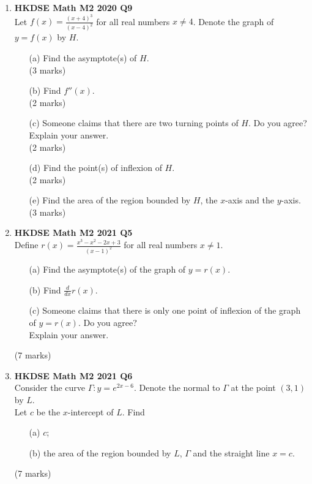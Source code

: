 \documentclass{report}
\begin{document}
\begin{enumerate}
	\newpage

	\item \textbf{HKDSE Math M2 2020 Q9}\\
	Let $\displaystyle f(x) = \frac{(x+4)^3}{(x-4)^2}$ for all real numbers $x \neq 4$. Denote the graph of $y = f(x)$ by $H$.
	\begin{enumerate}
		\item [(a)] Find the asymptote(s) of $H$. \\(3 marks)
		\item [(b)] Find $f''(x)$. \\(2 marks)
		\item [(c)] Someone claims that there are two turning points of $H$. Do you agree? Explain your answer. \\(2 marks)
		\item [(d)] Find the point(s) of inflexion of $H$. \\(2 marks)
		\item [(e)] Find the area of the region bounded by $H$, the $x$-axis and the $y$-axis. \\(3 marks)
	\end{enumerate}

	\item \textbf{HKDSE Math M2 2021 Q5}\\
	Define $\displaystyle r(x) = \frac{x^3 - x^2 -2x + 3}{(x-1)^2}$ for all real numbers $x \neq 1$.
	\begin{enumerate}
		\item [(a)] Find the asymptote(s) of the graph of $y = r(x)$.
		\item [(b)] Find $\displaystyle\frac{d}{dx}r(x)$.
		\item [(c)] Someone claims that there is only one point of inflexion of the graph of $y = r(x)$. Do you agree? \\
		Explain your answer.
	\end{enumerate}
	(7 marks)

	\item \textbf{HKDSE Math M2 2021 Q6}\\
	Consider the curve $\Gamma : y = e^{2x-6}$. Denote the normal to $\Gamma$ at the point $(3,1)$ by $L$. \\
	Let $c$ be the $x$-intercept of $L$. Find
	\begin{enumerate}
		\item [(a)]$c$;
		\item [(b)]the area of the region bounded by $L$, $\Gamma$ and the straight line $x=c$.
	\end{enumerate}
	(7 marks)


\end{enumerate}
\end{document}
